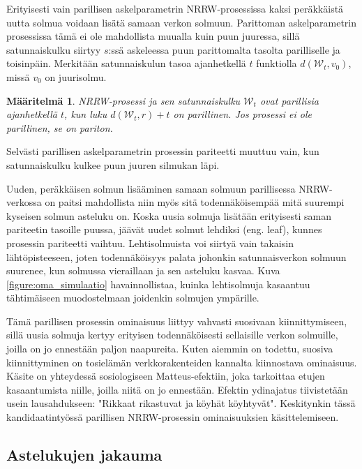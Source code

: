 \documentclass[finnish, 12pt, a4paper, sci, utf8, pdfa]{aaltothesis}
\newcommand{\Wrandom}{\mathcal{W}}
\newtheorem{definition}{Määritelmä}
\begin{document}
Erityisesti vain parillisen askelparametrin NRRW-prosessissa kaksi peräkkäistä uutta solmua voidaan lisätä samaan verkon solmuun. Parittoman askelparametrin prosessissa tämä ei ole mahdollista muualla kuin puun juuressa, sillä satunnaiskulku siirtyy $ s $:ssä askeleessa puun parittomalta tasolta parilliselle ja toisinpäin. Merkitään satunnaiskulun tasoa ajanhetkellä $ t $ funktiolla $ d(\Wrandom_{t}, v_{0}) $, missä $ v_{0} $ on juurisolmu.
\begin{definition}
NRRW-prosessi ja sen satunnaiskulku $ \Wrandom_{t} $ ovat parillisia ajanhetkellä $ t $, kun luku $ d(\Wrandom_{t}, r) + t $ on parillinen. Jos prosessi ei ole parillinen, se on pariton.
\label{definition:parity}
\end{definition}
Selvästi parillisen askelparametrin prosessin pariteetti muuttuu vain, kun satunnaiskulku kulkee puun juuren silmukan läpi.

Uuden, peräkkäisen solmun lisääminen samaan solmuun parillisessa NRRW-verkossa on paitsi mahdollista niin myös sitä todennäköisempää mitä suurempi kyseisen solmun asteluku on. Koska uusia solmuja lisätään erityisesti saman pariteetin tasoille puussa, jäävät uudet solmut lehdiksi (eng. leaf), kunnes prosessin pariteetti vaihtuu. Lehtisolmuista voi siirtyä vain takaisin lähtöpisteeseen, joten todennäköisyys palata johonkin satunnaisverkon solmuun suurenee, kun solmussa vieraillaan ja sen asteluku kasvaa. Kuva \ref{figure:oma_simulaatio} havainnollistaa, kuinka lehtisolmuja kasaantuu tähtimäiseen muodostelmaan joidenkin solmujen ympärille.

Tämä parillisen prosessin ominaisuus liittyy vahvasti suosivaan kiinnittymiseen, sillä uusia solmuja kertyy erityisen todennäköisesti sellaisille verkon solmuille, joilla on jo ennestään paljon naapureita. Kuten aiemmin on todettu, suosiva kiinnittyminen on tosielämän verkkorakenteiden kannalta kiinnostava ominaisuus. Käsite on yhteydessä sosiologiseen Matteus-efektiin, joka tarkoittaa etujen kasaantumista niille, joilla niitä on jo ennestään. Efektin ydinajatus tiivistetään usein lausahdukseen: "Rikkaat rikastuvat ja köyhät köyhtyvät". Keskitynkin tässä kandidaatintyössä parillisen NRRW-prosessin ominaisuuksien käsittelemiseen.

\subsection{Astelukujen jakauma}
\end{document}
